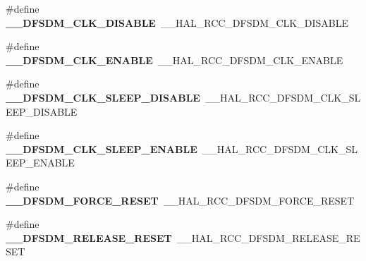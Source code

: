 \begin{DoxyCompactItemize}
\item 
\hypertarget{group___h_a_l___r_c_c___aliased_ga7cc3dfa13e529c36891e9fda56d63e08}{\#define {\bfseries \-\_\-\-\_\-\-D\-F\-S\-D\-M\-\_\-\-C\-L\-K\-\_\-\-D\-I\-S\-A\-B\-L\-E}~\-\_\-\-\_\-\-H\-A\-L\-\_\-\-R\-C\-C\-\_\-\-D\-F\-S\-D\-M\-\_\-\-C\-L\-K\-\_\-\-D\-I\-S\-A\-B\-L\-E}\label{group___h_a_l___r_c_c___aliased_ga7cc3dfa13e529c36891e9fda56d63e08}

\item 
\hypertarget{group___h_a_l___r_c_c___aliased_ga6ceaf4bc0064de3b57614a5c306b5d33}{\#define {\bfseries \-\_\-\-\_\-\-D\-F\-S\-D\-M\-\_\-\-C\-L\-K\-\_\-\-E\-N\-A\-B\-L\-E}~\-\_\-\-\_\-\-H\-A\-L\-\_\-\-R\-C\-C\-\_\-\-D\-F\-S\-D\-M\-\_\-\-C\-L\-K\-\_\-\-E\-N\-A\-B\-L\-E}\label{group___h_a_l___r_c_c___aliased_ga6ceaf4bc0064de3b57614a5c306b5d33}

\item 
\hypertarget{group___h_a_l___r_c_c___aliased_ga246eaf4f4f43fdb80ff77317ee626601}{\#define {\bfseries \-\_\-\-\_\-\-D\-F\-S\-D\-M\-\_\-\-C\-L\-K\-\_\-\-S\-L\-E\-E\-P\-\_\-\-D\-I\-S\-A\-B\-L\-E}~\-\_\-\-\_\-\-H\-A\-L\-\_\-\-R\-C\-C\-\_\-\-D\-F\-S\-D\-M\-\_\-\-C\-L\-K\-\_\-\-S\-L\-E\-E\-P\-\_\-\-D\-I\-S\-A\-B\-L\-E}\label{group___h_a_l___r_c_c___aliased_ga246eaf4f4f43fdb80ff77317ee626601}

\item 
\hypertarget{group___h_a_l___r_c_c___aliased_ga6f4f605ead06c11755915994afd63063}{\#define {\bfseries \-\_\-\-\_\-\-D\-F\-S\-D\-M\-\_\-\-C\-L\-K\-\_\-\-S\-L\-E\-E\-P\-\_\-\-E\-N\-A\-B\-L\-E}~\-\_\-\-\_\-\-H\-A\-L\-\_\-\-R\-C\-C\-\_\-\-D\-F\-S\-D\-M\-\_\-\-C\-L\-K\-\_\-\-S\-L\-E\-E\-P\-\_\-\-E\-N\-A\-B\-L\-E}\label{group___h_a_l___r_c_c___aliased_ga6f4f605ead06c11755915994afd63063}

\item 
\hypertarget{group___h_a_l___r_c_c___aliased_gadd88a8e0907c4d62b6582adfd75e2c6f}{\#define {\bfseries \-\_\-\-\_\-\-D\-F\-S\-D\-M\-\_\-\-F\-O\-R\-C\-E\-\_\-\-R\-E\-S\-E\-T}~\-\_\-\-\_\-\-H\-A\-L\-\_\-\-R\-C\-C\-\_\-\-D\-F\-S\-D\-M\-\_\-\-F\-O\-R\-C\-E\-\_\-\-R\-E\-S\-E\-T}\label{group___h_a_l___r_c_c___aliased_gadd88a8e0907c4d62b6582adfd75e2c6f}

\item 
\hypertarget{group___h_a_l___r_c_c___aliased_gaf9a8039a705ed8210b2bedc0c0edc91e}{\#define {\bfseries \-\_\-\-\_\-\-D\-F\-S\-D\-M\-\_\-\-R\-E\-L\-E\-A\-S\-E\-\_\-\-R\-E\-S\-E\-T}~\-\_\-\-\_\-\-H\-A\-L\-\_\-\-R\-C\-C\-\_\-\-D\-F\-S\-D\-M\-\_\-\-R\-E\-L\-E\-A\-S\-E\-\_\-\-R\-E\-S\-E\-T}\label{group___h_a_l___r_c_c___aliased_gaf9a8039a705ed8210b2bedc0c0edc91e}


\end{DoxyCompactItemize}
